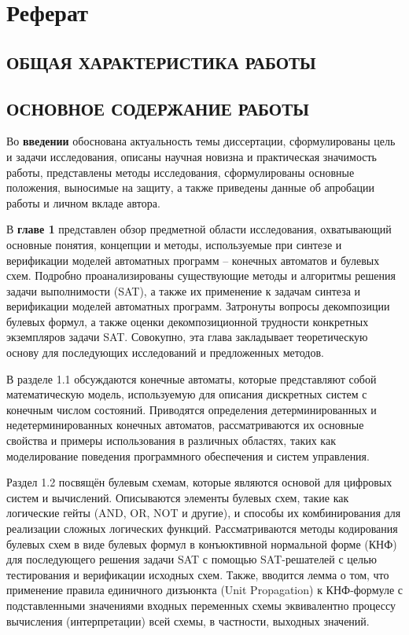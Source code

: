 \chapter*{Реферат}

\section*{ОБЩАЯ ХАРАКТЕРИСТИКА РАБОТЫ}




\section*{ОСНОВНОЕ СОДЕРЖАНИЕ РАБОТЫ}

Во \textbf{введении} обоснована актуальность темы диссертации, сформулированы цель и задачи исследования, описаны научная новизна и практическая значимость работы, представлены методы исследования, сформулированы основные положения, выносимые на защиту, а также приведены данные об апробации работы и личном вкладе автора.


В \textbf{главе 1} представлен обзор предметной области исследования, охватывающий основные понятия, концепции и методы, используемые при синтезе и верификации моделей автоматных программ \--- конечных автоматов и булевых схем.
Подробно проанализированы существующие методы и алгоритмы решения задачи выполнимости (SAT), а также их применение к задачам синтеза и верификации моделей автоматных программ.
Затронуты вопросы декомпозиции булевых формул, а также оценки декомпозиционной трудности конкретных экземпляров задачи SAT.
Совокупно, эта глава закладывает теоретическую основу для последующих исследований и предложенных методов.

В разделе 1.1 обсуждаются конечные автоматы, которые представляют собой математическую модель, используемую для описания дискретных систем с конечным числом состояний.
Приводятся определения детерминированных и недетерминированных конечных автоматов, рассматриваются их основные свойства и примеры использования в различных областях, таких как моделирование поведения программного обеспечения и систем управления.

Раздел 1.2 посвящён булевым схемам, которые являются основой для цифровых систем и вычислений.
Описываются элементы булевых схем, такие как логические гейты (AND, OR, NOT и другие), и способы их комбинирования для реализации сложных логических функций.
Рассматриваются методы кодирования булевых схем в виде булевых формул в конъюктивной нормальной форме (КНФ) для последующего решения задачи SAT с помощью SAT-решателей с целью тестирования и верификации исходных схем.
Также, вводится лемма о том, что применение правила единичного дизъюнкта (Unit Propagation) к КНФ-формуле с подставленными значениями входных переменных схемы эквивалентно процессу вычисления (интерпретации) всей схемы, в частности, выходных значений.

